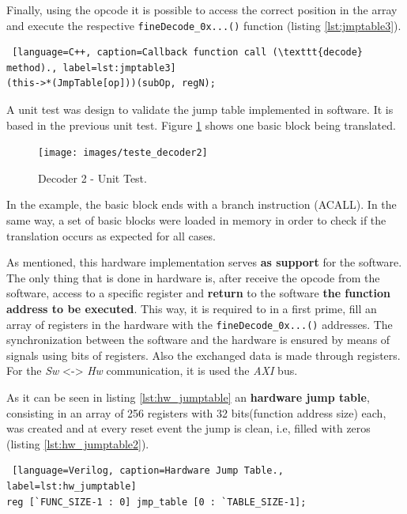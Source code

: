 Finally, using the opcode it is possible to access the correct position in the array and execute the respective \texttt{fineDecode\_0x...()} function (listing \ref{lst:jmptable3}).

\begin{lstlisting} [language=C++, caption=Callback function call (\texttt{decode} method)., label=lst:jmptable3]
(this->*(JmpTable[op]))(subOp, regN);
\end{lstlisting}

A unit test was design to validate the jump table implemented in software. It is based in the previous unit test. Figure \ref{fig:teste1_decoder2} shows one basic block being translated.

\begin{figure}[H]
\centerline{
\texttt{[image: images/teste\_decoder2]}
}
\caption{Decoder 2 - Unit Test.}
\label{fig:teste1_decoder2} 
\end{figure}

In the example, the basic block ends with a branch instruction (ACALL). In the same way, a set of basic blocks were loaded in memory in order to check if the translation occurs as expected for all cases. 


As mentioned, this hardware implementation serves \textbf{as support} for the software. The only thing that is done in hardware is, after receive the opcode from the software, access to a specific register and \textbf{return} to the software \textbf{the function address to be executed}. This way, it is required to in a first prime, fill an array of registers in the hardware with the \texttt{fineDecode\_0x...()} addresses. The synchronization between the software and the hardware is ensured by means of signals using bits of registers. Also the exchanged data is made through registers. For the \textit{Sw} <-> \textit{Hw} communication, it is used the \textit{AXI} bus.

As it can be seen in listing \ref{lst:hw_jumptable} an \textbf{hardware jump table}, consisting in an array of 256 registers with 32 bits(function address size) each, was created and at every reset event the jump is clean, i.e, filled with zeros (listing \ref{lst:hw_jumptable2}).

\begin{lstlisting} [language=Verilog, caption=Hardware Jump Table., label=lst:hw_jumptable]
reg [`FUNC_SIZE-1 : 0] jmp_table [0 : `TABLE_SIZE-1];
\end{lstlisting}

